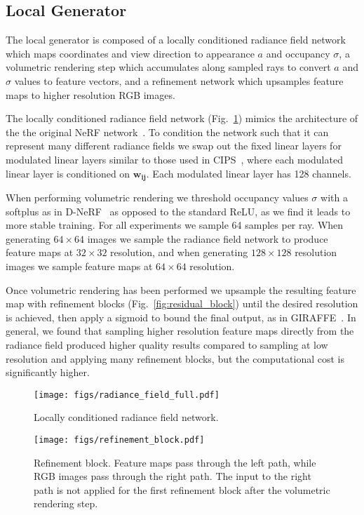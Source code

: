 \documentclass[10pt,twocolumn,letterpaper]{article}
\begin{document}
\subsection{Local Generator}

The local generator is composed of a locally conditioned radiance field network which maps coordinates and view direction to appearance $a$ and occupancy $\sigma$, a volumetric rendering step which accumulates along sampled rays to convert $a$ and $\sigma$ values to feature vectors, and a refinement network which upsamples feature maps to higher resolution RGB images.

The locally conditioned radiance field network (Fig.~\ref{fig:locally_conditioned_radiance_field_full}) mimics the architecture of the the original NeRF network~\cite{nerf}. To condition the network such that it can represent many different radiance fields we swap out the fixed linear layers for modulated linear layers similar to those used in CIPS~\cite{modfc}, where each modulated linear layer is conditioned on $\mathbf{w_{ij}}$. Each modulated linear layer has 128 channels.

When performing volumetric rendering we threshold occupancy values $\sigma$ with a softplus as in D-NeRF~\cite{nerfies} as opposed to the standard ReLU, as we find it leads to more stable training. For all experiments we sample 64 samples per ray. When generating $64\times64$ images we sample the radiance field network to produce feature maps at $32\times32$ resolution, and when generating $128\times128$ resolution images we sample feature maps at $64\times64$ resolution.

Once volumetric rendering has been performed we upsample the resulting feature map with refinement blocks (Fig.~\ref{fig:residual_block}) until the desired resolution is achieved, then apply a sigmoid to bound the final output, as in GIRAFFE~\cite{giraffe}. In general, we found that sampling higher resolution feature maps directly from the radiance field produced higher quality results compared to sampling at low resolution and applying many refinement blocks, but the computational cost is significantly higher.

\begin{figure}[h]
	\centering
	\texttt{[image: figs/radiance\_field\_full.pdf]}
	\caption{Locally conditioned radiance field network.}
	\label{fig:locally_conditioned_radiance_field_full}
\end{figure}

\begin{figure}[h]
	\centering
	\texttt{[image: figs/refinement\_block.pdf]}
	\caption{Refinement block. Feature maps pass through the left path, while RGB images pass through the right path. The input to the right path is not applied for the first refinement block after the volumetric rendering step.}
	\label{fig:refinement_block}
\end{figure}
\end{document}
